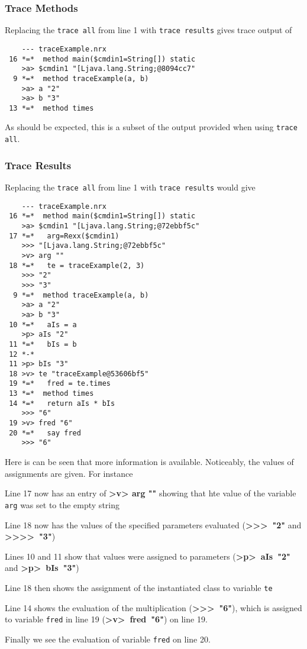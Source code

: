 \subsubsection{Trace Methods}
Replacing the \texttt{trace all} from line 1 with \texttt{trace results} gives trace output of
\begin{verbatim}
    --- traceExample.nrx 
 16 *=*  method main($cmdin1=String[]) static
    >a> $cmdin1 "[Ljava.lang.String;@8094cc7" 
  9 *=*  method traceExample(a, b)
    >a> a "2" 
    >a> b "3" 
 13 *=*  method times
\end{verbatim}
As should be expected, this is a subset of the output provided when using \texttt{trace all}.
\subsubsection{Trace Results}
Replacing the \texttt{trace all} from line 1 with \texttt{trace results} would give
\begin{verbatim}
    --- traceExample.nrx 
 16 *=*  method main($cmdin1=String[]) static
    >a> $cmdin1 "[Ljava.lang.String;@72ebbf5c" 
 17 *=*   arg=Rexx($cmdin1)
    >>> "[Ljava.lang.String;@72ebbf5c" 
    >v> arg "" 
 18 *=*   te = traceExample(2, 3)
    >>> "2" 
    >>> "3" 
  9 *=*  method traceExample(a, b)
    >a> a "2" 
    >a> b "3" 
 10 *=*   aIs = a
    >p> aIs "2" 
 11 *=*   bIs = b
 12 *-* 
 11 >p> bIs "3"
 18 >v> te "traceExample@53606bf5"
 19 *=*   fred = te.times
 13 *=*  method times
 14 *=*   return aIs * bIs
    >>> "6" 
 19 >v> fred "6"
 20 *=*   say fred
    >>> "6" 
\end{verbatim}
Here is can be seen that more information is available. Noticeably, the values of assignments are given.
For instance
\begin{description}
\item Line 17 now has an entry of \textbf{>v> arg ""} showing that hte value of the variable \texttt{arg} was set to the empty string
\item Line 18 now has the values of the specified parameters evaluated (\mbox{\textbf{\textgreater\textgreater> "2"}} and \mbox{\textbf{\textgreater\textgreater>> "3"}})
\item Lines 10 and 11 show that values were assigned to parameters (\mbox{\textbf{>p> aIs "2"}} and \mbox{\textbf{>p> bIs "3"})}
\item Line 18 then shows the assignment of the instantiated class to variable \texttt{te}
\item Line 14 shows the evaluation of the multiplication (\mbox{\textbf{\textgreater\textgreater> "6"}}), which is assigned to variable \texttt{fred} in line 19 (\mbox{\textbf{>v> fred "6"}}) on line 19.
\item Finally we see the evaluation of variable \texttt{fred} on line 20.
\end{description}
